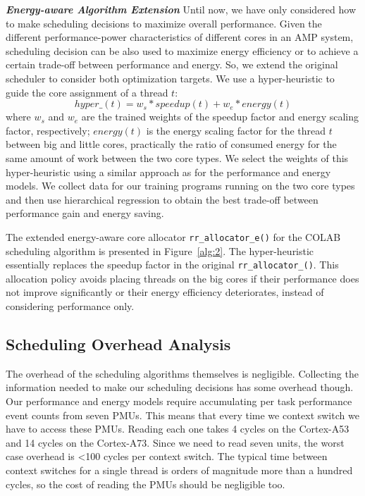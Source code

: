 \textbf{\textit{Energy-aware Algorithm Extension}}
Until now, we have only considered how to make scheduling decisions to maximize overall performance. Given the different performance-power characteristics of different cores in an AMP system, scheduling decision can be also used to maximize energy efficiency or to achieve a certain trade-off between performance and energy. So, we extend the original scheduler to consider both optimization targets. We use a hyper-heuristic to guide the core assignment of a thread $t$:
$$ hyper\_(t) = w_{s}*speedup(t) + w_{e}*energy(t) $$
where $w_{s}$ and $w_{e}$ are the trained weights of the speedup factor and energy scaling factor, respectively; $energy(t)$ is the energy scaling factor for the thread $t$ between big and little cores, practically the ratio of consumed energy for the same amount of work between the two core types. We select the weights of this hyper-heuristic using a similar approach as for the performance and energy models. We collect data for our training programs running on the two core types and then use hierarchical regression to obtain the best trade-off between performance gain and energy saving. 

The extended energy-aware core allocator \texttt{rr\_allocator\_e()} for the COLAB scheduling algorithm is presented in Figure~\ref{alg:2}. The hyper-heuristic essentially replaces the speedup factor in the original \texttt{rr\_allocator\_()}. This allocation policy avoids placing threads on the big cores if their performance does not improve significantly or their energy efficiency deteriorates, instead of considering performance only.

\subsection{Scheduling Overhead Analysis}
The overhead of the scheduling algorithms themselves is negligible. Collecting the information needed to make our scheduling decisions has some overhead though. Our performance and energy models require accumulating per task performance event counts from seven PMUs. This means that every time we context switch we have to access these PMUs. Reading each one takes 4 cycles on the Cortex-A53 and 14 cycles on the Cortex-A73. Since we need to read seven units, the worst case overhead is <100 cycles per context switch. The typical time between context switches for a single thread is orders of magnitude more than a hundred cycles, so the cost of reading the PMUs should be negligible too.

